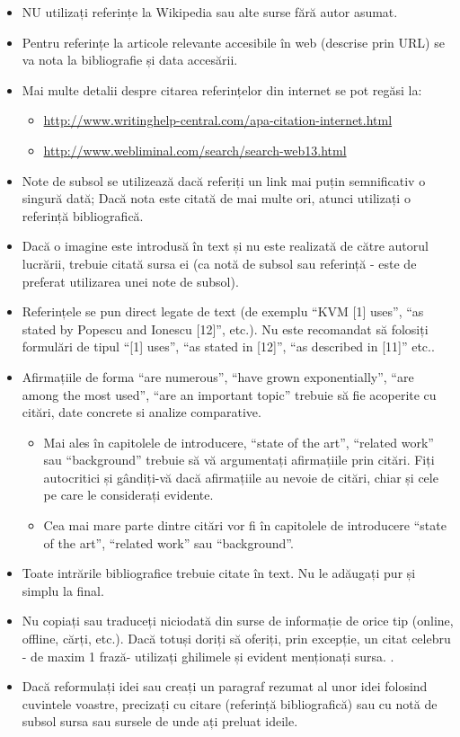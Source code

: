 \begin{itemize}
	\item 	NU utilizați referințe la Wikipedia sau alte surse fără autor asumat.
	\item 	Pentru referințe la articole relevante accesibile în web (descrise prin URL) se va nota la bibliografie și data accesării.
	\item 	Mai multe detalii despre citarea referințelor din internet se pot regăsi la:
	\begin{itemize}
		\item	\url{http://www.writinghelp-central.com/apa-citation-internet.html}
		\item	\url{http://www.webliminal.com/search/search-web13.html}
	\end{itemize}
	\item 	Note de subsol se utilizează dacă referiți un link mai puțin semnificativ o singură dată; Dacă nota este citată de mai multe ori, atunci utilizați o referință bibliografică.
	\item 	Dacă o imagine este introdusă în text și nu este realizată de către autorul lucrării, trebuie citată sursa ei (ca notă de subsol sau referință - este de preferat utilizarea unei note de subsol).
	\item 	Referințele se pun direct legate de text (de exemplu ``KVM [1] uses'', ``as stated by Popescu and Ionescu [12]'', etc.). Nu este recomandat să folosiți formulări de tipul ``[1] uses'', ``as stated in [12]'', ``as described in [11]'' etc..
	\item 	Afirmațiile de forma ``are numerous'', ``have grown exponentially'', ``are among the most used'', ``are an important topic'' trebuie să fie acoperite cu citări, date concrete si analize comparative.
	\begin{itemize}
		\item	Mai ales în capitolele de introducere, ``state of the art'', ``related work'' sau ``background'' trebuie să vă argumentați afirmațiile prin citări. Fiți autocritici și gândiți-vă dacă afirmațiile au nevoie de citări, chiar și cele pe care le considerați evidente.
		\item	Cea mai mare parte dintre citări vor fi în capitolele de introducere ``state of the art'', ``related work'' sau ``background''.
	\end{itemize}
	\item 	Toate intrările bibliografice trebuie citate în text. Nu le adăugați pur și simplu la final.
	\item 	Nu copiați sau traduceți niciodată din surse de informație de orice tip (online, offline, cărți, etc.). Dacă totuși doriți să oferiți, prin excepție, un citat celebru - de maxim 1 frază- utilizați ghilimele și evident menționați sursa. .
	\item 	Dacă reformulați idei sau creați un paragraf rezumat al unor idei folosind cuvintele voastre, precizați cu citare (referință bibliografică) sau cu notă de subsol sursa sau sursele de unde ați preluat ideile.
\end{itemize}

